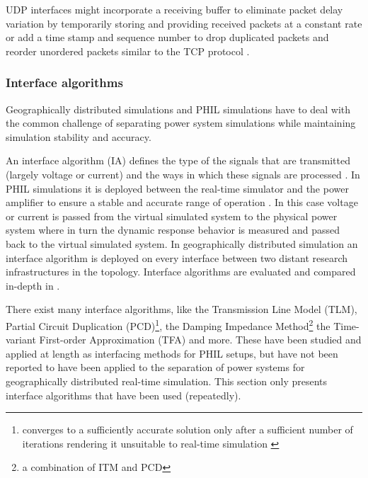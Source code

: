 \documentclass[a4paper]{atseminar}
\begin{document}
UDP interfaces might incorporate a receiving buffer to eliminate packet delay variation \cite{rfc3393} by temporarily storing and providing received packets at a constant rate or add a time stamp and sequence number to drop duplicated packets and reorder unordered packets similar to the TCP protocol \cite{stevic2017europe}. 

\subsubsection{Interface algorithms}
\label{MH:sec:ia}

Geographically distributed simulations and PHIL simulations have to deal with the common challenge of separating power system simulations while maintaining simulation stability and accuracy.

An interface algorithm (IA) defines the type of the signals that are transmitted (largely voltage or current) and the ways in which these signals are processed \cite{ren2008}. In PHIL simulations it is deployed between the real-time simulator and the power amplifier to ensure a stable and accurate range of operation \cite{montoya2020}. In this case voltage or current is passed from the virtual simulated system to the physical power system where in turn the dynamic response behavior is measured and passed back to the virtual simulated system.
In geographically distributed simulation an interface algorithm is deployed on every interface between two distant research infrastructures in the topology. Interface algorithms are evaluated and compared in-depth in \cite{ren2008, brandl2017}.

There exist many interface algorithms, like the Transmission Line Model (TLM), Partial Circuit Duplication (PCD)\footnote{converges to a sufficiently accurate solution only after a sufficient number of iterations rendering it unsuitable to real-time simulation \cite{ren2008}}, the Damping Impedance Method\footnote{a combination of ITM and PCD} the Time-variant First-order Approximation (TFA) and more. These have been studied and applied at length as interfacing methods for PHIL setups,
but have not been reported to have been applied to the separation of power systems for geographically distributed real-time simulation. This section only presents interface algorithms that have been used (repeatedly).

\end{document}
